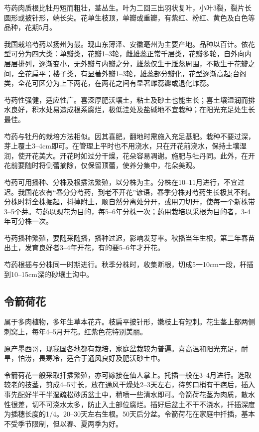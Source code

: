 \documentclass{ctexbook}
\begin{document}
芍药肉质根比牡丹短而粗壮，茎丛生。叶为二回三出羽状复叶，小叶3裂，裂片长圆形或披针形，端长尖。花单生枝顶，单瓣或重瓣，有紫红、粉红、黄色及白色等品种，花期5月。

我国栽培芍药以扬州为最。现山东薄泽、安徽亳州为主要产地。品种以百计。依花型可分为四大类：单瓣类，花瓣1--3轮，雌雄蕊正常千层类，花瓣多轮，自外向内层层排列，逐渐变小，无外瓣与内瓣之分，雄蕊仅生于雌蕊周围，不散生于花瓣之间，全花扁平；楼子类，有显著外瓣1--3轮，雄蕊部分瓣化，花型逐渐高起;台阁类，全花可区分为上下两花，在两花之间有显著雌蕊瓣或退化雌蕊。

芍药性强健，适应性广。喜深厚肥沃壤土，粘土及砂土也能生长；喜土壤湿润而排水良好，积水处易造成根系腐烂，极低洼处及盐碱地不宜栽种；在阳光充足处生长最佳。

芍药与牡丹的栽培方法相似。因其喜肥，翻地时需施入充足基肥。栽种不要过深，芽上覆土3--4cm即可。在管理上平时也不用浇水，只在开花前浇水，保持土壤湿润，使开花美大。开花时如过分干燥，花朵容易凋谢。施肥与牡丹同。此外，在开花前要随时将侧蕾摘除，仅保留顶蕾，使养分集中，花朵美观。

芍药可用播种、分株及根插法繁殖，以分株为主。分株在10--11月进行，不宜过迟。我国花农有“春分分芍药，到老不开花”谚语，春季分株对芍药生长极其不利。分株时将全株掘起，抖掉附土，顺自然分离处分开，或用刀切开，使每一个新株带3--5个芽。芍药以观花为目的，每5--6年分株一次；药用栽培以采根为目的者，3-4年可分株一次。

芍药播种繁殖，要随采随播，播种过迟，影响发芽率。秋播当年生根，第二年春苗出土，发育良好者3--4年开花，有的要5--6年才开花。

芍药根插与分株同一时期进行。秋季分株时，收集断根，切成5一10cm一段，杆插到10--15cm深的砂壤土沟中。
\subsection{令箭荷花}
属于多肉植物，多年生草本花卉。枝扁平披针形，嫩枝上有短刺。花生茎上部两侧刺窝上，每年4--5月开花。红紫色花特别美丽。

原产墨西哥，现我国各地都有栽培，家庭盆栽较为普遍。喜高温和阳光充足，耐旱，怕涝，畏寒冷，适合于通风良好及肥沃砂土中。

令箭荷花一般采取扦插繁殖，亦可嫁接在仙人掌上。托插一般在3--4月进行。选取较老的技茎，剪成4--5寸长，放在通风干燥处2--3天左右，待剪口梢有干疤后，插入事先配好半干半湿疏松砂质盆土中，稍喷一些清水即可。令箭荷花茎为肉质，散水性很差，切不可浇水太多，防止入土部位腐烂。插好后盆土不干不浇水，扦插深度为插穗长度的1/4。20--30天左右生根。50天后分盆。令箭荷花在家庭中扦插，基本不受季节限制，但以春、夏两季为好。
\end{document}
